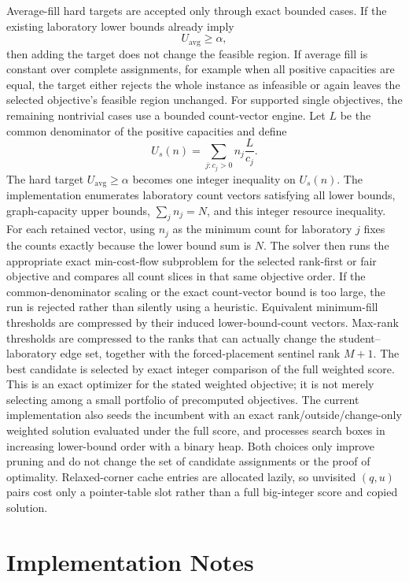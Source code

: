 \documentclass[11pt,a4paper]{article}
\begin{document}
Average-fill hard targets are accepted only through exact bounded cases.  If
the existing laboratory lower bounds already imply
\[
  U_{\mathrm{avg}}\ge \alpha,
\]
then adding the target does not change the feasible region.  If average fill
is constant over complete assignments, for example when all positive
capacities are equal, the target either rejects the whole instance as
infeasible or again leaves the selected objective's feasible region unchanged.
For supported single objectives, the remaining nontrivial cases use a bounded
count-vector engine.  Let \(L\) be the common denominator of the positive
capacities and define
\[
  U_s(n)=\sum_{j:c_j>0} n_j\frac{L}{c_j}.
\]
The hard target \(U_{\mathrm{avg}}\ge\alpha\) becomes one integer inequality on
\(U_s(n)\).  The implementation enumerates laboratory count vectors satisfying
all lower bounds, graph-capacity upper bounds, \(\sum_j n_j=N\), and this
integer resource inequality.  For each retained vector, using \(n_j\) as the
minimum count for laboratory \(j\) fixes the counts exactly because the lower
bound sum is \(N\).  The solver then runs the appropriate exact min-cost-flow
subproblem for the selected rank-first or fair objective and compares all
count slices in that same objective order.  If the common-denominator scaling
or the exact count-vector bound is too large, the run is rejected rather than
silently using a heuristic.
Equivalent minimum-fill thresholds are compressed by their induced
lower-bound-count vectors.  Max-rank thresholds are compressed to the ranks
that can actually change the student--laboratory edge set, together with the
forced-placement sentinel rank \(M+1\).  The best candidate is selected by
exact integer comparison of the full weighted score.  This is an exact
optimizer for the stated weighted objective; it is not merely selecting among
a small portfolio of precomputed objectives.  The current implementation also
seeds the incumbent with an exact rank/outside/change-only weighted solution
evaluated under the full score, and processes search boxes in increasing
lower-bound order with a binary heap.  Both choices only improve pruning and
do not change the set of candidate assignments or the proof of optimality.
Relaxed-corner cache entries are allocated lazily, so unvisited
\((q,u)\) pairs cost only a pointer-table slot rather than a full
big-integer score and copied solution.

\section{Implementation Notes}
\end{document}
